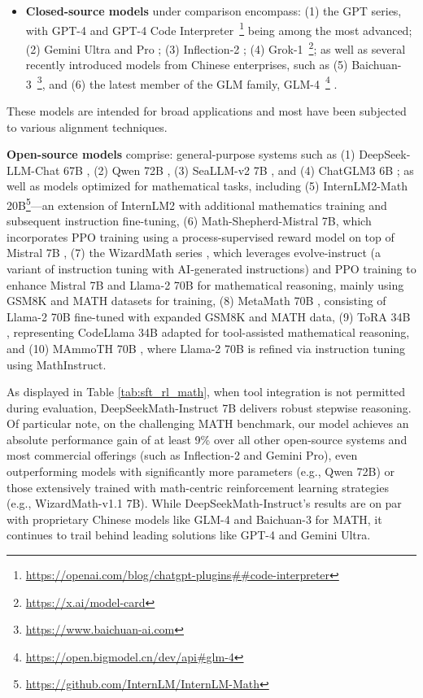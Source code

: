 \begin{itemize}[topsep=0pt]
    \item \textbf{Closed-source models} under comparison encompass: (1) the GPT series, with GPT-4 \citep{gpt4} and GPT-4 Code Interpreter~\footnote{\url{https://openai.com/blog/chatgpt-plugins\#\#code-interpreter}} being among the most advanced; (2) Gemini Ultra and Pro \citep{gemini}; (3) Inflection-2 \citep{inflection-2}; (4) Grok-1~\footnote{\url{https://x.ai/model-card}}; as well as several recently introduced models from Chinese enterprises, such as (5) Baichuan-3~\footnote{\url{https://www.baichuan-ai.com}}, and (6) the latest member of the GLM family, GLM-4~\footnote{\url{https://open.bigmodel.cn/dev/api\#glm-4}} \citep{glm}.
\end{itemize}

These models are intended for broad applications and most have been subjected to various alignment techniques.

\item \textbf{Open-source models} comprise: general-purpose systems such as (1) DeepSeek-LLM-Chat 67B \citep{deepseek-llm}, (2) Qwen 72B \citep{qwen}, (3) SeaLLM-v2 7B \citep{seallm}, and (4) ChatGLM3 6B \citep{chatglm3}; as well as models optimized for mathematical tasks, including (5) InternLM2-Math 20B\footnote{\url{https://github.com/InternLM/InternLM-Math}}—an extension of InternLM2 with additional mathematics training and subsequent instruction fine-tuning, (6) Math-Shepherd-Mistral 7B, which incorporates PPO training \citep{schulman2017proximal} using a process-supervised reward model on top of Mistral 7B \citep{mistral}, (7) the WizardMath series \citep{wizardmath}, which leverages evolve-instruct (a variant of instruction tuning with AI-generated instructions) and PPO training to enhance Mistral 7B and Llama-2 70B \citep{llama2} for mathematical reasoning, mainly using GSM8K and MATH datasets for training, (8) MetaMath 70B \citep{metamath}, consisting of Llama-2 70B fine-tuned with expanded GSM8K and MATH data, (9) ToRA 34B \cite{tora}, representing CodeLlama 34B adapted for tool-assisted mathematical reasoning, and (10) MAmmoTH 70B \citep{MathInstruct}, where Llama-2 70B is refined via instruction tuning using MathInstruct.

As displayed in Table \ref{tab:sft_rl_math}, when tool integration is not permitted during evaluation, DeepSeekMath-Instruct 7B delivers robust stepwise reasoning. Of particular note, on the challenging MATH benchmark, our model achieves an absolute performance gain of at least 9\% over all other open-source systems and most commercial offerings (such as Inflection-2 and Gemini Pro), even outperforming models with significantly more parameters (e.g., Qwen 72B) or those extensively trained with math-centric reinforcement learning strategies (e.g., WizardMath-v1.1 7B). While DeepSeekMath-Instruct’s results are on par with proprietary Chinese models like GLM-4 and Baichuan-3 for MATH, it continues to trail behind leading solutions like GPT-4 and Gemini Ultra.

